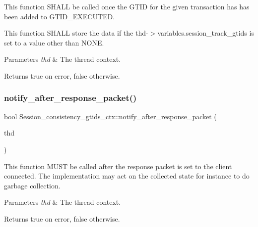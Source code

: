 This function S\+H\+A\+LL be called once the G\+T\+ID for the given transaction has has been added to G\+T\+I\+D\+\_\+\+E\+X\+E\+C\+U\+T\+ED.

This function S\+H\+A\+LL store the data if the thd-\/$>$variables.\+session\+\_\+track\+\_\+gtids is set to a value other than N\+O\+NE.


\begin{DoxyParams}{Parameters}
{\em thd} & The thread context. \\
\hline
\end{DoxyParams}
\begin{DoxyReturn}{Returns}
true on error, false otherwise. 
\end{DoxyReturn}
\mbox{\label{classSession__consistency__gtids__ctx_a828ab638fa33aa0d43d1b162a3d34803}} 
\subsubsection{\texorpdfstring{notify\+\_\+after\+\_\+response\+\_\+packet()}{notify\_after\_response\_packet()}}
{\footnotesize\ttfamily bool Session\+\_\+consistency\+\_\+gtids\+\_\+ctx\+::notify\+\_\+after\+\_\+response\+\_\+packet (\begin{DoxyParamCaption}\item[{const T\+HD $\ast$}]{thd }\end{DoxyParamCaption})\hspace{0.3cm}{\ttfamily [virtual]}}

This function M\+U\+ST be called after the response packet is set to the client connected. The implementation may act on the collected state for instance to do garbage collection.


\begin{DoxyParams}{Parameters}
{\em thd} & The thread context. \\
\hline
\end{DoxyParams}
\begin{DoxyReturn}{Returns}
true on error, false otherwise. 
\end{DoxyReturn}
\mbox{\label{classSession__consistency__gtids__ctx_a13e57b8ec0b7eb1f24b690e82b35b89f}} 
